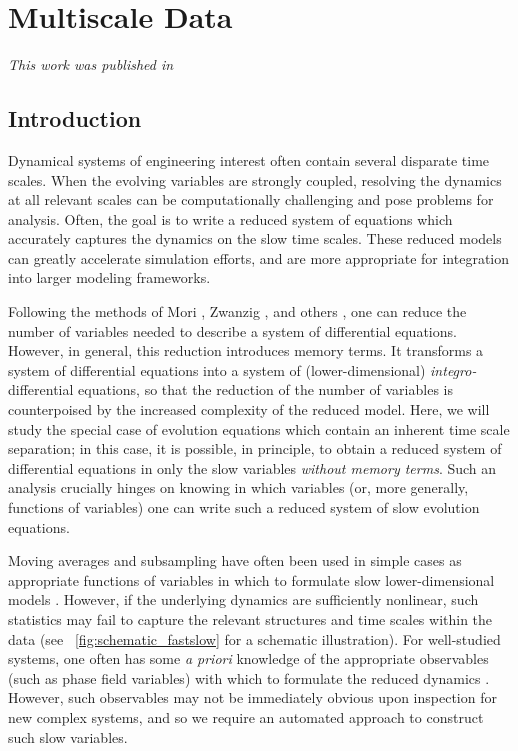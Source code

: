 
\chapter{Multiscale Data\label{ch:multiscale}}

\graphicspath{{ch-multiscale/figures/}}

{\em This work was published in \citep{dsilva2015data}}

\section{Introduction}

Dynamical systems of engineering interest often contain several disparate time scales.
%
When the evolving variables are strongly coupled, resolving the
dynamics at all relevant scales can be computationally challenging and pose problems for analysis.
%
Often, the goal is to write a reduced system of equations which accurately captures the dynamics on the slow time scales.
%
These reduced models can greatly accelerate simulation efforts, and are more appropriate for integration into larger modeling frameworks.

Following the methods of Mori \cite{mori1965transport}, Zwanzig \cite{zwanzig1961memory}, and others \cite{brey1981nonlinear, chorin2000optimal, hijon2010mori}, one can reduce the number of variables needed to describe a system of differential equations.
%
However, in general, this reduction introduces memory terms.
%
It transforms a system of differential equations into a system of (lower-dimensional) {\em integro-}differential equations,
so that the reduction of the number of variables is counterpoised by the increased complexity of the  reduced model.
%
Here, we will study the special case of evolution equations which contain an inherent time scale separation;
in this case, it is possible, in principle, to obtain a reduced system of differential equations in only the slow variables {\em without memory terms}.
%
Such an analysis crucially hinges on knowing in which variables (or, more generally, functions of variables) one can write such a reduced system of slow evolution equations.

Moving averages and subsampling have often been used in simple cases as appropriate functions of variables in which to formulate slow lower-dimensional models \cite{pavliotis2007parameter}.
%
However, if the underlying dynamics are sufficiently nonlinear, such statistics may
fail to capture the relevant structures and time scales within the data (see \fig~\ref{fig:schematic_fastslow} for a schematic illustration).
%
For well-studied systems, one often has some {\em a priori} knowledge of the appropriate observables (such as phase field variables) with which to formulate the reduced dynamics \cite{chen2002phase, wheeler1992phase}.
%
However, such observables may not be immediately obvious upon inspection for new complex systems, and so we require an automated approach to construct such slow variables.


